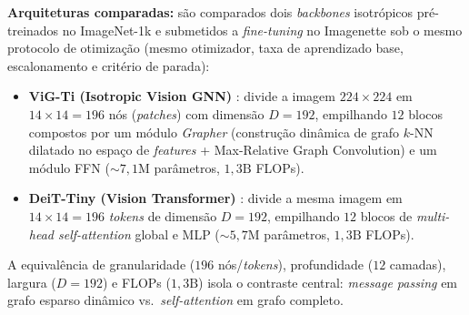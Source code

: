 \documentclass{article}
\begin{document}
\textbf{Arquiteturas comparadas:} são comparados dois \textit{backbones} isotrópicos pré-treinados no ImageNet-1k e submetidos a \textit{fine-tuning} no Imagenette sob o mesmo protocolo de otimização (mesmo otimizador, taxa de aprendizado base, escalonamento e critério de parada):
\begin{itemize}
    \item \textbf{ViG-Ti (Isotropic Vision GNN)} \citep{han2022vig}: divide a imagem $224 \times 224$ em $14 \times 14 = 196$ nós (\textit{patches}) com dimensão $D = 192$, empilhando $12$ blocos compostos por um módulo \textit{Grapher} (construção dinâmica de grafo $k$-NN dilatado no espaço de \textit{features} + Max-Relative Graph Convolution) e um módulo FFN ($\sim 7{,}1\text{M}$ parâmetros, $1{,}3\text{B}$ FLOPs).
    \item \textbf{DeiT-Tiny (Vision Transformer)} \citep{touvron2021deit}: divide a mesma imagem em $14 \times 14 = 196$ \textit{tokens} de dimensão $D = 192$, empilhando $12$ blocos de \textit{multi-head self-attention} global e MLP ($\sim 5{,}7\text{M}$ parâmetros, $1{,}3\text{B}$ FLOPs).
\end{itemize}
A equivalência de granularidade ($196$ nós/\textit{tokens}), profundidade ($12$ camadas), largura ($D=192$) e FLOPs ($1{,}3\text{B}$) isola o contraste central: \textit{message passing} em grafo esparso dinâmico vs.\ \textit{self-attention} em grafo completo.
\end{document}
